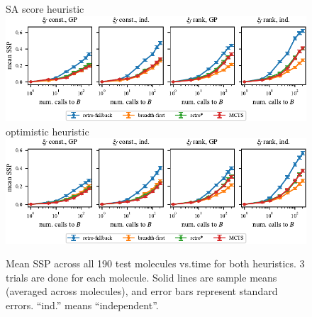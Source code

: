 \begin{figure}
    \centering
    {\large SA score heuristic} \\
    \vspace{0.3cm}
    \includegraphics{figures/comparison/retrostar190/ssp_sascore.pdf}
    \vspace{0.3cm}
    {\large optimistic heuristic} \\
    \vspace{0.3cm}
    \includegraphics{figures/comparison/retrostar190/ssp_optimistic.pdf}
    \caption[Mean SSP over time for 190 test molecules.]{
        Mean SSP across all 190 test molecules vs.\@ time for both heuristics.
        3 trials are done for each molecule.
        Solid lines are sample means (averaged across molecules),
        and error bars represent standard errors.
        ``ind.'' means ``independent''.
    }
    \label{fig:ssp-rs190-sascore}
\end{figure}

